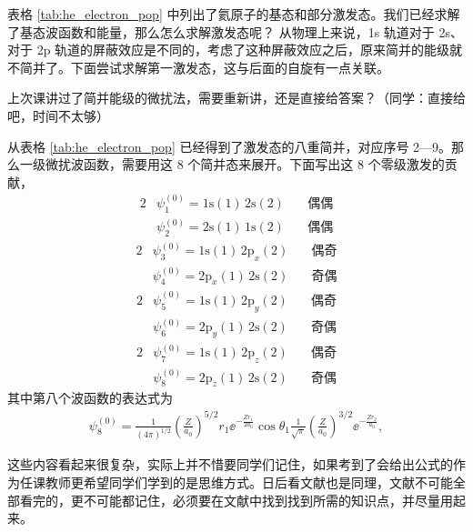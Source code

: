 表格 \ref{tab:he_electron_pop} 中列出了氦原子的基态和部分激发态。我们已经求解了基态波函数和能量，那么怎么求解激发态呢？
从物理上来说，1s 轨道对于 2s、对于 2p 轨道的屏蔽效应是不同的，考虑了这种屏蔽效应之后，原来简并的能级就不简并了。下面尝试求解第一激发态，这与后面的自旋有一点关联。

上次课讲过了简并能级的微扰法，需要重新讲，还是直接给答案？（同学：直接给吧，时间不太够）

从表格 \ref{tab:he_electron_pop} 已经得到了激发态的八重简并，对应序号 2---9。那么一级微扰波函数，需要用这 8 个简并态来展开。下面写出这 8 个零级激发的贡献，
\begin{alignat}{2}
&\psi_1^{(0)} = \mathrm{1s(1)\,2s(2)} &\quad \text{偶偶} \\
&\psi_2^{(0)} = \mathrm{2s(1)\,1s(2)} &\quad \text{偶偶}
\end{alignat}
\begin{alignat}{2}
&\psi_3^{(0)} = \mathrm{1s(1)\,2p}_x(2) &\quad \text{偶奇} \\
&\psi_4^{(0)} = \mathrm{2p}_x(1)\,2\mathrm{s}(2) &\quad \text{奇偶}
\end{alignat}
\begin{alignat}{2}
&\psi_5^{(0)} = \mathrm{1s(1)\,2p}_y(2) &\quad \text{偶奇} \\
&\psi_6^{(0)} = \mathrm{2p}_y(1)\,2\mathrm{s}(2) &\quad \text{奇偶}
\end{alignat}
\begin{alignat}{2}
&\psi_7^{(0)} = \mathrm{1s(1)\,2p}_z(2) &\quad \text{偶奇} \\
&\psi_8^{(0)} = \mathrm{2p}_z(1)\,2\mathrm{s}(2) &\quad \text{奇偶}
\end{alignat}
其中第八个波函数的表达式为
\begin{align}
    \psi_8^{(0)} = \frac1{(4\pi)^{1/2}} \left(\frac Z{a_0}\right)^{5/2} r_1 \ee^{-\frac{Z r_1}{2a_0}} \cos\theta_1 \frac1{\sqrt{\pi}} \left(\frac{Z}{a_0}\right)^{3/2} \ee^{-\frac{Zr_2}{a_0}}, 
\end{align}

这些内容看起来很复杂，实际上并不惜要同学们记住，如果考到了会给出公式的作为任课教师更希望同学们学到的是思维方式。日后看文献也是同理，文献不可能全部看完的，更不可能都记住，必须要在文献中找到找到所需的知识点，并尽量用起来。

